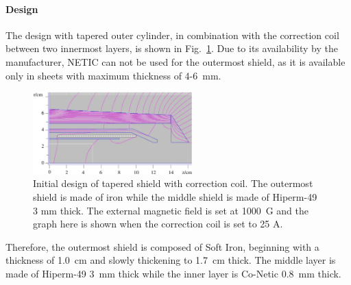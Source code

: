 \documentclass[12pt]{article}
\begin{document}
\paragraph{Design}
The design with tapered outer cylinder, in combination with the correction coil  between
two innermost layers, is shown in  Fig.~\ref{Tapered_Shield_Design}.
Due to its availability by the manufacturer, NETIC can not be used  for the outermost shield, as it 
is available only in sheets with maximum thickness of 4-6~mm. 
%
\begin{figure}[htbp]
\centering
\includegraphics[width=0.55\textwidth]{R2083_Iron_hiperm49_CONETIC_TaperedShieldDesign.eps}
\caption{\small{Initial design of tapered shield with correction coil. 
The outermost shield is made of iron while the middle shield is made 
of Hiperm-49 3 mm thick. The external magnetic field is set at 1000~G and the
graph here is shown when the correction coil is set to 25 A.}}
\label{Tapered_Shield_Design}
\end{figure}
%
Therefore, the outermost  shield is composed of Soft Iron, beginning with a thickness of 1.0~cm and 
slowly thickening to 1.7~cm thick. 
The middle layer is made of Hiperm-49 3~mm thick while  the inner layer is Co-Netic 
0.8~mm thick.
\end{document}

